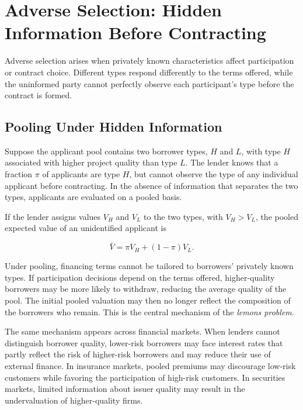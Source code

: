 \section{Adverse Selection: Hidden Information Before Contracting}

Adverse selection arises when privately known characteristics affect participation or contract choice. Different types respond differently to the terms offered, while the uninformed party cannot perfectly observe each participant's type before the contract is formed.

\subsection{Pooling Under Hidden Information} 

Suppose the applicant pool contains two borrower types, $H$ and $L$, with type $H$ associated with higher project quality than type $L$. The lender knows that a fraction $\pi$ of applicants are type $H$, but cannot observe the type of any individual applicant before contracting. In the absence of information that separates the two types, applicants are evaluated on a pooled basis.

If the lender assigns values $V_H$ and $V_L$ to the two types, with $V_H>V_L$, the pooled expected value of an unidentified applicant is

\begin{equation}
\bar V=\pi V_H+(1-\pi)V_L.
\label{eq:ch3-pooling-value}
\end{equation}

Under pooling, financing terms cannot be tailored to borrowers' privately known types. If participation decisions depend on the terms offered, higher-quality borrowers may be more likely to withdraw, reducing the average quality of the pool. The initial pooled valuation may then no longer reflect the composition of the borrowers who remain. This is the central mechanism of the \emph{lemons problem}.

The same mechanism appears across financial markets. When lenders cannot distinguish borrower quality, lower-risk borrowers may face interest rates that partly reflect the risk of higher-risk borrowers and may reduce their use of external finance. In insurance markets, pooled premiums may discourage low-risk customers while favoring the participation of high-risk customers. In securities markets, limited information about issuer quality may result in the undervaluation of higher-quality firms.

